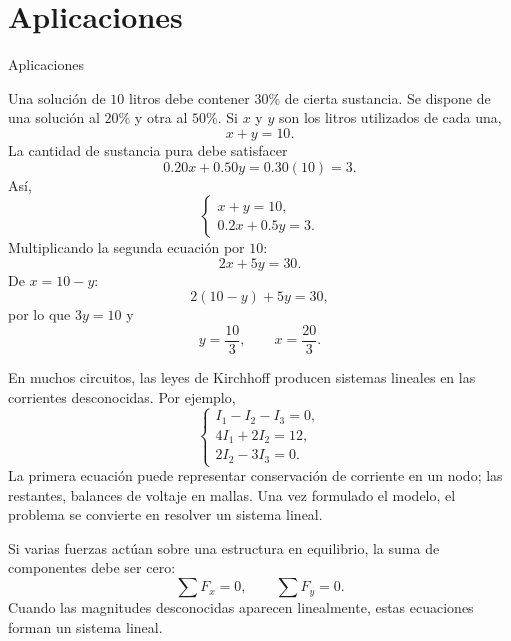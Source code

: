\documentclass[aspectratio=169,9pt]{beamer}
\theoremstyle{remark}
\begin{document}
\section{Aplicaciones}
\begin{frame}[allowframebreaks,t]{Aplicaciones}
\par{}\par\smallskip

Una solución de $10$ litros debe contener $30\%$ de cierta sustancia. Se dispone de una solución al
$20\%$ y otra al $50\%$. Si $x$ y $y$ son los litros utilizados de cada una,
\[
x+y=10.
\]
La cantidad de sustancia pura debe satisfacer
\[
0.20x+0.50y=0.30(10)=3.
\]
Así,
\[
\begin{cases}
x+y=10,\\
0.2x+0.5y=3.
\end{cases}
\]
Multiplicando la segunda ecuación por $10$:
\[
2x+5y=30.
\]
De $x=10-y$:
\[
2(10-y)+5y=30,
\]
por lo que $3y=10$ y
\[
y=\frac{10}{3},\qquad x=\frac{20}{3}.
\]

\par{}\par\smallskip

En muchos circuitos, las leyes de Kirchhoff producen sistemas lineales en las corrientes desconocidas.
Por ejemplo,
\[
\begin{cases}
I_1-I_2-I_3=0,\\
4I_1+2I_2=12,\\
2I_2-3I_3=0.
\end{cases}
\]
La primera ecuación puede representar conservación de corriente en un nodo; las restantes, balances de
voltaje en mallas. Una vez formulado el modelo, el problema se convierte en resolver un sistema lineal.

\par{}\par\smallskip

Si varias fuerzas actúan sobre una estructura en equilibrio, la suma de componentes debe ser cero:
\[
\sum F_x=0,\qquad \sum F_y=0.
\]
Cuando las magnitudes desconocidas aparecen linealmente, estas ecuaciones forman un sistema lineal.
\end{frame}
\end{document}
